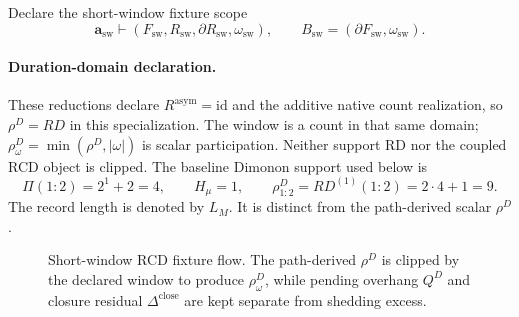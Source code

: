 Declare the short-window fixture scope
\[
\mathbf a_{\mathrm{sw}}\vdash(F_{\mathrm{sw}},R_{\mathrm{sw}},\partial R_{\mathrm{sw}},\omega_{\mathrm{sw}}),
\qquad
B_{\mathrm{sw}}=(\partial F_{\mathrm{sw}},\omega_{\mathrm{sw}}).
\]

\paragraph{Duration-domain declaration.}
These reductions declare \(R^{\mathrm{asym}}=\mathrm{id}\) and the additive native
count realization, so \(\rho^D=RD\) in this specialization. The window is a
count in that same domain; \(\rho^D_\omega=\min(\rho^D,|\omega|)\) is scalar
participation. Neither support RD nor the coupled RCD object is clipped.
The baseline Dimonon support used below is
\[
\Pi(1{:}2)=2^1+2=4,
\qquad
H_\mu=1,
\qquad
\rho^D_{1{:}2}=RD^{(1)}(1{:}2)=2\cdot4+1=9.
\]
The record length is denoted by \(L_M\). It is distinct from the path-derived scalar \(\rho^D\).

\begin{figure}[h]
\centering
\scriptsize
{}
\caption{Short-window RCD fixture flow. The path-derived \(\rho^D\) is clipped by the declared window to produce \(\rho^D_\omega\), while pending overhang \(Q^D\) and closure residual \(\Delta^{\mathrm{close}}\) are kept separate from shedding excess.}
\label{fig:manual-short-window-setup}
\end{figure}

